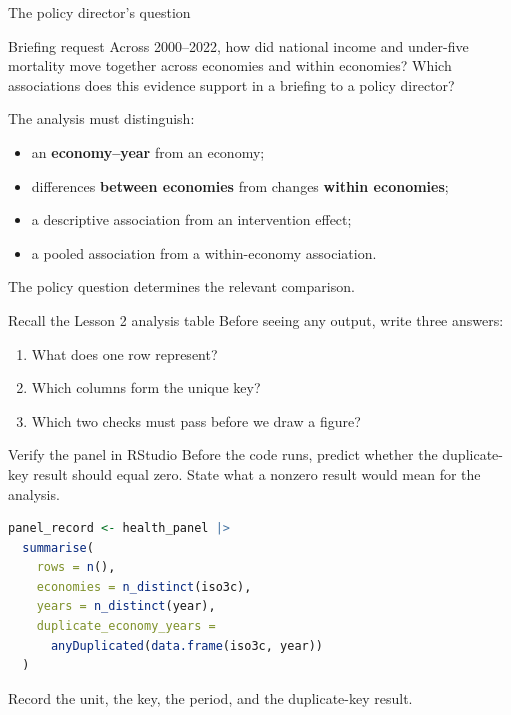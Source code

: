 \begin{frame}{The policy director's question}
  \begin{block}{Briefing request}
    Across 2000--2022, how did national income and under-five mortality move
    together across economies and within economies? Which associations does
    this evidence support in a briefing to a policy director?
  \end{block}

  \vspace{0.5em}
  The analysis must distinguish:
  \begin{itemize}
    \item an \textbf{economy--year} from an economy;
    \item differences \textbf{between economies} from changes \textbf{within economies};
    \item a descriptive association from an intervention effect;
    \item a pooled association from a within-economy association.
  \end{itemize}

  \vfill
  The policy question determines the relevant comparison.
\end{frame}

\begin{frame}{Recall the Lesson 2 analysis table}
  Before seeing any output, write three answers:
  \begin{enumerate}
    \item What does one row represent?
    \item Which columns form the unique key?
    \item Which two checks must pass before we draw a figure?
  \end{enumerate}

\end{frame}

\begin{frame}[fragile]{Verify the panel in RStudio}
  Before the code runs, predict whether the duplicate-key result should equal
  zero. State what a nonzero result would mean for the analysis.

\begin{lstlisting}[language=R]
panel_record <- health_panel |>
  summarise(
    rows = n(),
    economies = n_distinct(iso3c),
    years = n_distinct(year),
    duplicate_economy_years =
      anyDuplicated(data.frame(iso3c, year))
  )
\end{lstlisting}

  Record the unit, the key, the period, and the duplicate-key result.
\end{frame}

